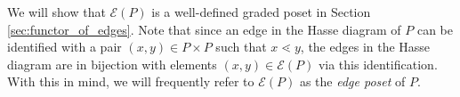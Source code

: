 \documentclass[10 pt]{amsart}
\theoremstyle{plain}
\theoremstyle{definition}
\newtheorem{defn}[thm]{Definition}
\theoremstyle{remark}
\numberwithin{equation}{section}
\newcommand\rk{\operatorname{rk}}
\begin{document}


We will show that $\mathcal{E}(P)$ is a well-defined graded poset in Section \ref{sec:functor_of_edges}.  Note that since an edge in the Hasse diagram of $P$ can be identified with a pair $(x,y)\in P\times P$ such that $x\lessdot y$, the edges in the Hasse diagram are in bijection with elements $(x,y)\in \mathcal E(P)$ via this identification.  With this in mind, we will frequently refer to $\mathcal{E}(P)$ as the {\it edge poset} of $P$. 
\end{document}
